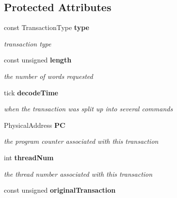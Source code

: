 \subsection*{Protected Attributes}
\begin{CompactItemize}
\item 
const TransactionType {\bf type}\label{class_d_r_a_msim_i_i_1_1_transaction_8d8b784a0f82bfc5fed936d335d2d786}

\begin{CompactList}\small\item\em transaction type \item\end{CompactList}\item 
const unsigned {\bf length}\label{class_d_r_a_msim_i_i_1_1_transaction_b902d44749de4defc083b7538e05182a}

\begin{CompactList}\small\item\em the number of words requested \item\end{CompactList}\item 
tick {\bf decodeTime}\label{class_d_r_a_msim_i_i_1_1_transaction_38069cc0a59d1b13b7f2cfced6ab0d48}

\begin{CompactList}\small\item\em when the transaction was split up into several commands \item\end{CompactList}\item 
PhysicalAddress {\bf PC}\label{class_d_r_a_msim_i_i_1_1_transaction_d9d99dfe661ea94e0eaaab4b417b1469}

\begin{CompactList}\small\item\em the program counter associated with this transaction \item\end{CompactList}\item 
int {\bf threadNum}\label{class_d_r_a_msim_i_i_1_1_transaction_d7881887e5ad330b281f4a5a196a8822}

\begin{CompactList}\small\item\em the thread number associated with this transaction \item\end{CompactList}\item 
const unsigned {\bf originalTransaction}\label{class_d_r_a_msim_i_i_1_1_transaction_7ca48ffef86da91fa3acfe4dda88f922}


\end{CompactItemize}
